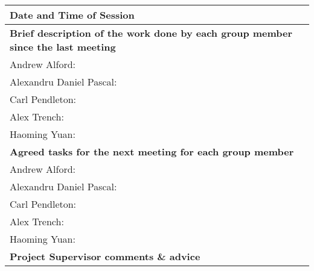 \documentclass[11pt]{article}
\begin{document}
\begin{flushleft}

\begin{table}[]
\centering
\begin{tabular}{|l|l|}
\hline
\textbf{Date and Time of Session}                               &                                             \\ \hline
\multicolumn{2}{|l|}{\textbf{Brief description of the work done by each group member since the last meeting}} \\ \hline
\multicolumn{2}{|l|}{Andrew Alford:}                                                                          \\ \hline
\multicolumn{2}{|l|}{\multirow{2}{*}{Alexandru Daniel Pascal:}}                                               \\
\multicolumn{2}{|l|}{}                                                                                        \\ \hline
\multicolumn{2}{|l|}{Carl Pendleton:}                                                                         \\ \hline
\multicolumn{2}{|l|}{Alex Trench:}                                                                            \\ \hline
\multicolumn{2}{|l|}{Haoming Yuan:}                                                                           \\ \hline
\multicolumn{2}{|l|}{\textbf{Agreed tasks for the next meeting for each group member}}                        \\ \hline
\multicolumn{2}{|l|}{Andrew Alford:}                                                                          \\ \hline
\multicolumn{2}{|l|}{Alexandru Daniel Pascal:}                                                                \\ \hline
\multicolumn{2}{|l|}{Carl Pendleton:}                                                                         \\ \hline
\multicolumn{2}{|l|}{Alex Trench:}                                                                            \\ \hline
\multicolumn{2}{|l|}{Haoming Yuan:}                                                                           \\ \hline
\multicolumn{2}{|l|}{\textbf{Project Supervisor comments \& advice}}                                          \\ \hline

\end{tabular}
\end{table}
\end{flushleft}
\end{document}
